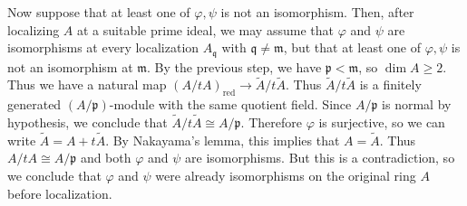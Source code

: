 {Now suppose that at least one of $\varphi,\psi$ is not an isomorphism. Then, after localizing $A$ at a suitable prime ideal, we may assume that $\varphi$ and $\psi$ are isomorphisms at every localization $A_{\mathfrak q}$ with $\mathfrak q\ne\mathfrak m$, but that at least one of $\varphi,\psi$ is not an isomorphism at $\mathfrak m$. By the previous step, we have $\mathfrak p<\mathfrak m$, so $\dim A\ge2$.  Thus we have a natural map $(A/tA)_{\mathrm{red}}\to\widetilde A/t\widetilde A$.  Thus $\widetilde A/t\widetilde A$ is a finitely generated $(A/\mathfrak p)$-module with the same quotient field. Since $A/\mathfrak p$ is normal by hypothesis, we conclude that $\widetilde A/t\widetilde A\cong A/\mathfrak p$. Therefore $\varphi$ is surjective, so we can write $\widetilde A=A+t\widetilde A$. By Nakayama's lemma, this implies that $A=\widetilde A$. Thus $A/tA\cong A/\mathfrak p$ and both $\varphi$ and $\psi$ are isomorphisms. But this is a contradiction, so we conclude that $\varphi$ and $\psi$ were already isomorphisms on the original ring $A$ before localization.}
